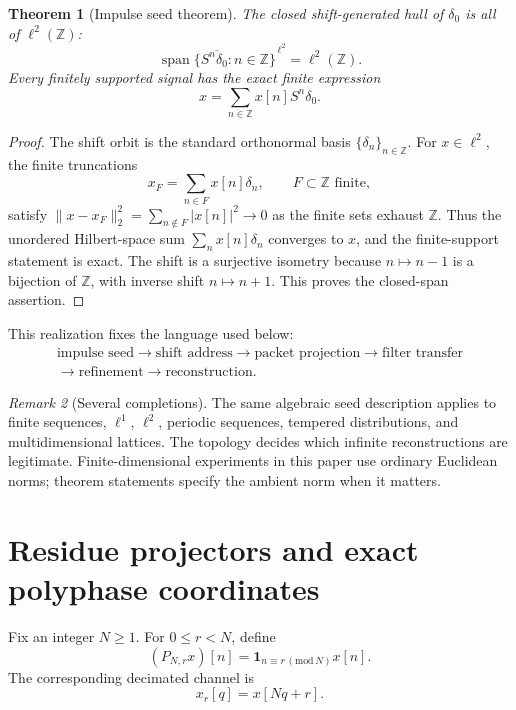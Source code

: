 \documentclass[11pt]{article}
\newtheorem{theorem}{Theorem}[section]
\theoremstyle{definition}
\theoremstyle{remark}
\newtheorem{remark}[theorem]{Remark}
\newcommand{\bbZ}{\mathbb Z}
\begin{document}
\begin{theorem}[Impulse seed theorem]\label{result:01}
The closed shift-generated hull of $\delta_0$ is all of $\ell^2(\bbZ)$:
\[
\boxed{
\overline{\operatorname{span}\{S^n\delta_0:n\in\bbZ\}}^{\,\ell^2}
=\ell^2(\bbZ).
}
\]
Every finitely supported signal has the exact finite expression
\[
x=\sum_{n\in\bbZ}x[n]S^n\delta_0.
\]
\end{theorem}

\begin{proof}
The shift orbit is the standard orthonormal basis $\{\delta_n\}_{n\in\bbZ}$. For $x\in\ell^2$, the finite truncations
\[
x_F=\sum_{n\in F}x[n]\delta_n,\qquad F\subset\bbZ\text{ finite},
\]
satisfy $\|x-x_F\|_2^2=\sum_{n\notin F}|x[n]|^2\to0$ as the finite sets exhaust $\bbZ$. Thus the unordered Hilbert-space sum $\sum_nx[n]\delta_n$ converges to $x$, and the finite-support statement is exact. The shift is a surjective isometry because $n\mapsto n-1$ is a bijection of $\bbZ$, with inverse shift $n\mapsto n+1$. This proves the closed-span assertion.
\end{proof}

This realization fixes the language used below:
\[
\begin{gathered}
\text{impulse seed}\longrightarrow\text{shift address}\longrightarrow\text{packet projection}\longrightarrow\text{filter transfer}\\
\longrightarrow\text{refinement}\longrightarrow\text{reconstruction}.
\end{gathered}
\]

\begin{remark}[Several completions]
The same algebraic seed description applies to finite sequences, $\ell^1$, $\ell^2$, periodic sequences, tempered distributions, and multidimensional lattices. The topology decides which infinite reconstructions are legitimate. Finite-dimensional experiments in this paper use ordinary Euclidean norms; theorem statements specify the ambient norm when it matters.
\end{remark}

\section{Residue projectors and exact polyphase coordinates}

Fix an integer $N\ge1$. For $0\le r<N$, define
\[
(P_{N,r}x)[n]
=
\mathbf 1_{n\equiv r\, (\mathrm{mod}\,N)}x[n].
\]
The corresponding decimated channel is
\[
x_r[q]=x[Nq+r].
\]
\end{document}

